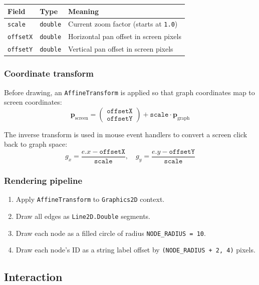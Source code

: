 \documentclass[12pt,a4paper]{article}
\begin{document}
\begin{center}
\begin{tabular}{lll}
\toprule
\textbf{Field} & \textbf{Type} & \textbf{Meaning} \\
\midrule
\texttt{scale}   & \texttt{double} & Current zoom factor (starts at \texttt{1.0}) \\
\texttt{offsetX} & \texttt{double} & Horizontal pan offset in screen pixels \\
\texttt{offsetY} & \texttt{double} & Vertical pan offset in screen pixels \\
\bottomrule
\end{tabular}
\end{center}

\subsubsection*{Coordinate transform}

Before drawing, an \texttt{AffineTransform} is applied so that graph
coordinates map to screen coordinates:
\[
  \mathbf{p}_{\text{screen}} = \begin{pmatrix} \texttt{offsetX} \\ \texttt{offsetY} \end{pmatrix}
  + \texttt{scale} \cdot \mathbf{p}_{\text{graph}}
\]

The inverse transform is used in mouse event handlers to convert a screen
click back to graph space:
\[
  g_x = \frac{e.x - \texttt{offsetX}}{\texttt{scale}}, \quad
  g_y = \frac{e.y - \texttt{offsetY}}{\texttt{scale}}
\]

\subsubsection*{Rendering pipeline}

\begin{enumerate}
  \item Apply \texttt{AffineTransform} to \texttt{Graphics2D} context.
  \item Draw all edges as \texttt{Line2D.Double} segments.
  \item Draw each node as a filled circle of radius \texttt{NODE\_RADIUS = 10}.
  \item Draw each node's ID as a string label offset by
        \texttt{(NODE\_RADIUS + 2, 4)} pixels.
\end{enumerate}

\subsection{Interaction}
\end{document}
